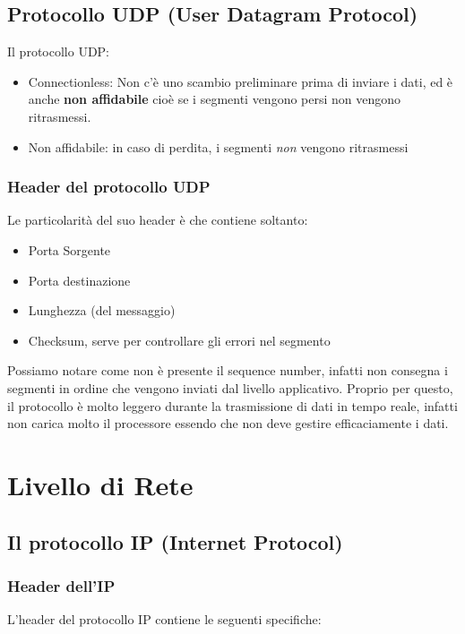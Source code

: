 \documentclass[a4paper]{article}
\begin{document}
\subsection{Protocollo UDP (User Datagram Protocol)}

Il protocollo UDP:
\begin{itemize}
  \item Connectionless: Non c'è uno scambio preliminare prima di inviare i dati, ed è anche \textbf{non affidabile}
  cioè se i segmenti vengono persi non vengono ritrasmessi. 
  \item Non affidabile: in caso di perdita, i segmenti \textit{non} vengono ritrasmessi
\end{itemize}

\subsubsection{Header del protocollo UDP}

Le particolarità del suo header è che contiene soltanto:
\begin{itemize}
  \item Porta Sorgente
  \item Porta destinazione
  \item Lunghezza (del messaggio)
  \item Checksum, serve per controllare gli errori nel segmento
\end{itemize}
Possiamo notare come non è presente il sequence number, infatti non consegna i segmenti in ordine che 
vengono inviati dal livello applicativo. Proprio per questo, il protocollo è molto leggero durante
la trasmissione di dati in tempo reale, infatti non carica molto il processore essendo
che non deve gestire efficaciamente i dati.

\pagebreak

\section{Livello di Rete}

\subsection{Il protocollo IP (Internet Protocol)}

\subsubsection{Header dell'IP}
L'header del protocollo IP contiene le seguenti specifiche:
\end{document}
